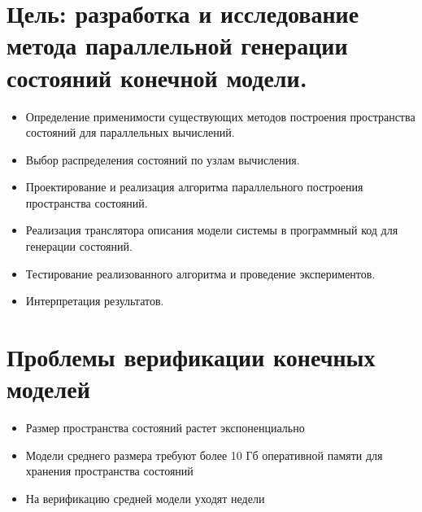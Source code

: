 \documentclass[12pt]{article}
\begin{document}
\TitleSlide

\section{Цель: разработка и исследование метода параллельной генерации состояний конечной
  модели.}
\label{sec:goal-tasks}

\small
\begin{itemize}
\item Определение применимости существующих методов построения пространства состояний для
  параллельных вычислений.
\item Выбор распределения состояний по узлам вычисления.
\item Проектирование и реализация алгоритма параллельного построения пространства состояний.
\item Реализация транслятора описания модели системы в программный код для генерации состояний.
\item Тестирование реализованного алгоритма и проведение экспериментов.
\item Интерпретация результатов.
\end{itemize}
\normalsize




\section{Проблемы верификации конечных моделей}
\label{sec:verif-troubles}

\begin{itemize}
\item Размер пространства состояний растет экспоненциально

\item Модели среднего размера требуют более 10 Гб оперативной памяти для хранения пространства состояний

\item На верификацию средней модели уходят недели
\end{itemize}
\end{document}
